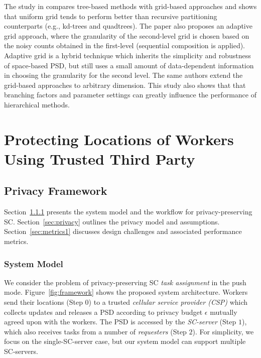 \documentclass{USC-Thesis}
\numberwithin{equation}{chapter}
\begin{document}
The study in \cite{qardaji2012differentially} compares tree-based methods with grid-based approaches and shows that uniform grid tends to perform better than recursive partitioning counterparts (e.g., kd-trees and quadtrees). The paper also proposes an adaptive grid approach, where the granularity of the second-level grid is chosen based on the noisy counts obtained in the first-level (sequential composition is applied). Adaptive grid is a hybrid technique which inherits the simplicity and robustness of space-based PSD, but still uses a small amount of data-dependent information in choosing the granularity for the second level. The same authors \cite{qardaji2013understanding} extend the grid-based approaches to arbitrary dimension. This study also shows that that branching factors and parameter settings can greatly influence the performance of hierarchical methods.



\section{Protecting Locations of Workers Using Trusted Third Party}

\subsection{Privacy Framework}
\label{sec:fwork}
Section~\ref{sec:system1} presents the system model and the workflow for privacy-preserving SC.
Section~\ref{sec:privacy} outlines the privacy model and assumptions.  
Section~\ref{sec:metrics1} discusses design challenges and associated performance metrics.

\subsubsection{System Model}
\label{sec:system1}
We consider the problem of privacy-preserving SC {\em task assignment} in the push mode. Figure~\ref{fig:framework} shows the proposed system architecture. Workers send their locations (Step $0$) to a trusted {\em cellular service provider (CSP)} which collects updates and releases a PSD according to privacy budget $\epsilon$ mutually agreed upon with the workers. The PSD is accessed by the {\em SC-server} (Step $1$), which also receives tasks from a number of {\em requesters} (Step $2$). For simplicity, we focus on the single-SC-server case, but our system model can support multiple SC-servers.
\end{document}
